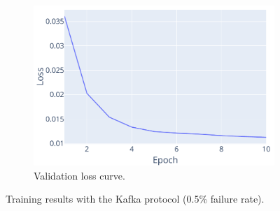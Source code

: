 \begin{figure}[!htb]
\begin{subfigure}[b]{0.6\linewidth}
    \end{subfigure}
    \begin{subfigure}[b]{0.6\linewidth}
        \centering
        \includegraphics[width=\linewidth]{figs/scenario2/kafka_loss.pdf}
        \caption{Validation loss curve.}
        \label{fig:loss_kafka}
    \end{subfigure}
    \caption{Training results with the Kafka protocol (0.5\% failure rate).}
    \label{fig:results_kafka}
\end{figure}

